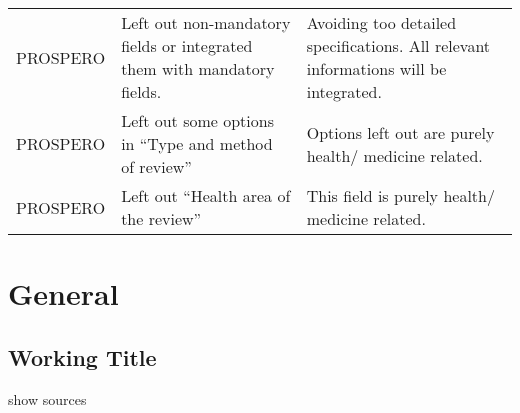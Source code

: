 \documentclass[]{article}
\begin{document}
\begin{longtable}[]{@{}lll@{}}
\begin{minipage}[t]{0.15\columnwidth}
PROSPERO\strut
\end{minipage} & \begin{minipage}[t]{0.33\columnwidth}\raggedright
Left out non-mandatory fields or integrated them with mandatory
fields.\strut
\end{minipage} & \begin{minipage}[t]{0.43\columnwidth}\raggedright
Avoiding too detailed specifications. All relevant informations will be
integrated.\strut
\end{minipage}\tabularnewline
\begin{minipage}[t]{0.15\columnwidth}\raggedright
PROSPERO\strut
\end{minipage} & \begin{minipage}[t]{0.33\columnwidth}\raggedright
Left out some options in ``Type and method of review''\strut
\end{minipage} & \begin{minipage}[t]{0.43\columnwidth}\raggedright
Options left out are purely health/ medicine related.\strut
\end{minipage}\tabularnewline
\begin{minipage}[t]{0.15\columnwidth}\raggedright
PROSPERO\strut
\end{minipage} & \begin{minipage}[t]{0.33\columnwidth}\raggedright
Left out ``Health area of the review''\strut
\end{minipage} & \begin{minipage}[t]{0.43\columnwidth}\raggedright
This field is purely health/ medicine related.\strut
\end{minipage}\tabularnewline
\bottomrule
\end{longtable}

\hypertarget{general}{%
\section{General}\label{general}}

\hypertarget{working-title}{%
\subsection{Working Title}\label{working-title}}

show sources
\end{document}
